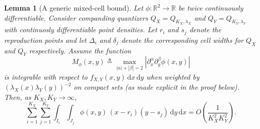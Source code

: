 \documentclass{article}
\newtheorem{lemma}{Lemma}
\newcommand{\R}{\mathbb{R}}
\newcommand{\abs}[1]{\left\lvert #1 \right\rvert}
\newcommand{\dd}{\,\mathrm{d}}
\newcommand{\defeq}{\triangleq}
\begin{document}
\begin{lemma}[A generic mixed-cell bound]\label{lem:mixed_cell_bound}
Let $\phi:\R^2\to\R$ be twice continuously differentiable. Consider companding quantizers $Q_X=Q_{K_X,\lambda_X}$ and $Q_Y=Q_{K_Y,\lambda_Y}$ with continuosly differentiable point densities. Let $r_i$ and $s_j$ denote the reproduction points and let $\Delta_i$ and $\delta_j$ denote the corresponding cell widths for $Q_X$ and $Q_Y$ respectively.
Assume the function
\[
M_\phi(x,y)\defeq \max_{|\alpha|+|\beta|=2}\abs{\partial_x^\alpha\partial_y^\beta \phi(x,y)}
\]
is integrable with respect to $f_{X,Y}(x,y)\dd x\dd y$ when weighted by $(\lambda_X(x)\lambda_Y(y))^{-2}$ on compact sets (as made explicit in the proof below).
Then, as $K_X,K_Y\to\infty$,
\begin{equation}\label{eq:mixed_term_order_template}
\sum_{i=1}^{K_X}\sum_{j=1}^{K_Y}\int_{I_i}\int_{J_j}
\phi(x,y)\,(x-r_i)(y-s_j)\dd y\dd x
=O\!\left(\frac{1}{K_X^2K_Y^2}\right).
\end{equation}
\end{lemma}
\end{document}
